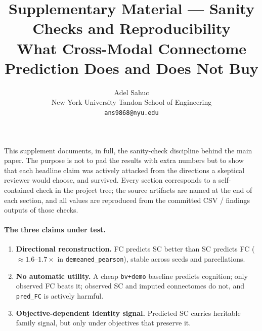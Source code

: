 \documentclass{article}
\title{Supplementary Material --- Sanity Checks and Reproducibility\\
\large What Cross-Modal Connectome Prediction Does and Does Not Buy}
\author{%
  Adel Sahuc \\
  New York University Tandon School of Engineering \\
  \texttt{ans9868@nyu.edu}%
}
\newcommand{\dpear}{\texttt{demeaned\_pearson}}
\newcommand{\bvdemo}{\texttt{bv+demo}}
\begin{document}
\maketitle

\noindent
This supplement documents, in full, the sanity-check discipline behind the main paper. The
purpose is not to pad the results with extra numbers but to show that each headline claim was
actively attacked from the directions a skeptical reviewer would choose, and survived. Every
section corresponds to a self-contained check in the project tree; the source artifacts are
named at the end of each section, and all values are reproduced from the committed CSV / findings
outputs of those checks.

\paragraph{The three claims under test.}
\begin{enumerate}
\item \textbf{Directional reconstruction.} FC predicts SC better than SC predicts FC
($\approx 1.6$--$1.7\times$ in \dpear), stable across seeds and parcellations.
\item \textbf{No automatic utility.} A cheap \bvdemo{} baseline predicts cognition; only
observed FC beats it; observed SC and imputed connectomes do not, and \texttt{pred\_FC} is
actively harmful.
\item \textbf{Objective-dependent identity signal.} Predicted SC carries heritable family
signal, but only under objectives that preserve it.
\end{enumerate}
\end{document}
